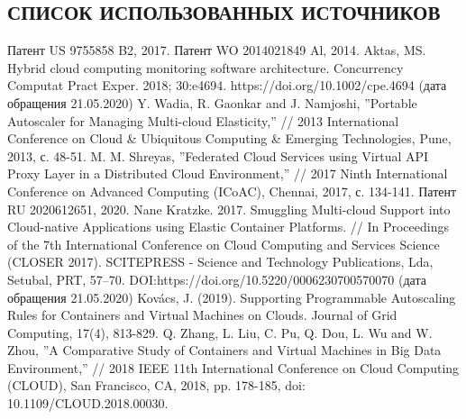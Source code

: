\begin{center}
\section*{СПИСОК ИСПОЛЬЗОВАННЫХ ИСТОЧНИКОВ}
\end{center}
\begingroup
\renewcommand{\section}[2]{}%
\begin{thebibliography}{40}
Патент US 9755858 B2, 2017.
Патент WO 2014021849 Al, 2014.
Aktas, MS. Hybrid cloud computing monitoring software architecture. Concurrency Computat Pract Exper. 2018; 30:e4694. https://doi.org/10.1002/cpe.4694 (дата обращения 21.05.2020)
Y. Wadia, R. Gaonkar and J. Namjoshi, ''Portable Autoscaler for Managing Multi-cloud Elasticity,'' // 2013 International Conference on Cloud \& Ubiquitous Computing \& Emerging Technologies, Pune, 2013, с. 48-51.
M. M. Shreyas, ''Federated Cloud Services using Virtual API Proxy Layer in a Distributed Cloud Environment,'' // 2017 Ninth International Conference on Advanced Computing (ICoAC), Chennai, 2017, с. 134-141.
Патент RU 2020612651, 2020.
Nane Kratzke. 2017. Smuggling Multi-cloud Support into Cloud-native Applications using Elastic Container Platforms. // In Proceedings of the 7th International Conference on Cloud Computing and Services Science (CLOSER 2017). SCITEPRESS - Science and Technology Publications, Lda, Setubal, PRT, 57–70. DOI:https://doi.org/10.5220/0006230700570070 (дата обращения 21.05.2020) 
Kovács, J. (2019). Supporting Programmable Autoscaling Rules for Containers and Virtual Machines on Clouds. Journal of Grid Computing, 17(4), 813-829.
Q. Zhang, L. Liu, C. Pu, Q. Dou, L. Wu and W. Zhou, ''A Comparative Study of Containers and Virtual Machines in Big Data Environment,'' // 2018 IEEE 11th International Conference on Cloud Computing (CLOUD), San Francisco, CA, 2018, pp. 178-185, doi: 10.1109/CLOUD.2018.00030.

\end{thebibliography}
